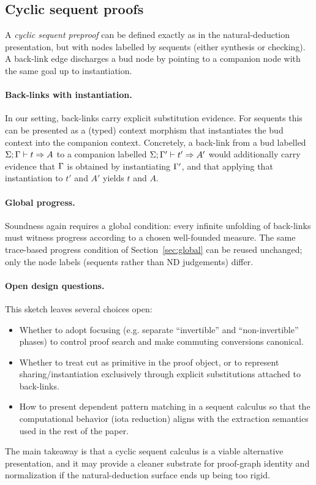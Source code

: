 \subsection{Cyclic sequent proofs}

A \emph{cyclic sequent preproof} can be defined exactly as in the natural-deduction presentation, but with nodes labelled by sequents (either synthesis or checking).
A back-link edge discharges a bud node by pointing to a companion node with the same goal up to instantiation.

\paragraph{Back-links with instantiation.}
In our setting, back-links carry explicit substitution evidence.
For sequents this can be presented as a (typed) context morphism that instantiates the bud context into the companion context.
Concretely, a back-link from a bud labelled \(\Sigma;\Gamma \vdash t \Rightarrow A\) to a companion labelled \(\Sigma;\Gamma' \vdash t' \Rightarrow A'\) would additionally carry evidence that \(\Gamma\) is obtained by instantiating \(\Gamma'\), and that applying that instantiation to \(t'\) and \(A'\) yields \(t\) and \(A\).

\paragraph{Global progress.}
Soundness again requires a global condition: every infinite unfolding of back-links must witness progress according to a chosen well-founded measure.
The same trace-based progress condition of Section~\ref{sec:global} can be reused unchanged; only the node labels (sequents rather than ND judgements) differ.

\paragraph{Open design questions.}
This sketch leaves several choices open:
\begin{itemize}[leftmargin=*]
\item Whether to adopt focusing (e.g. separate ``invertible'' and ``non-invertible'' phases) to control proof search and make commuting conversions canonical.
\item Whether to treat cut as primitive in the proof object, or to represent sharing/instantiation exclusively through explicit substitutions attached to back-links.
\item How to present dependent pattern matching in a sequent calculus so that the computational behavior (iota reduction) aligns with the extraction semantics used in the rest of the paper.
\end{itemize}

The main takeaway is that a cyclic sequent calculus is a viable alternative presentation, and it may provide a cleaner substrate for proof-graph identity and normalization if the natural-deduction surface ends up being too rigid.

